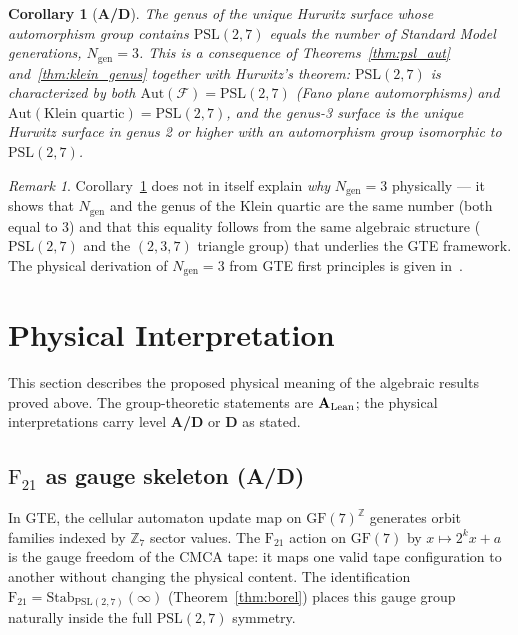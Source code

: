 \documentclass[11pt]{article}
\newtheorem{corollary}[theorem]{Corollary}
\theoremstyle{remark}
\newtheorem{remark}[theorem]{Remark}
\newcommand{\GF}[1]{\ensuremath{\mathrm{GF}(#1)}}
\newcommand{\Ngen}{\ensuremath{N_{\mathrm{gen}}}}
\newcommand{\PSLtwo}{\ensuremath{\mathrm{PSL}(2,7)}}
\newcommand{\FineSeven}{\ensuremath{\mathrm{F}_{21}}}
\newcommand{\CatAL}{\ensuremath{\textbf{A}_{\rm Lean}}}
\newcommand{\CatAD}{\textbf{A/D}}
\newcommand{\CatD}{\textbf{D}}
\begin{document}
\begin{corollary}[\CatAD]
\label{cor:genus_ngen}
The genus of the unique Hurwitz surface whose automorphism group contains $\PSLtwo$
equals the number of Standard Model generations, $\Ngen = 3$.
This is a consequence of Theorems~\ref{thm:psl_aut} and~\ref{thm:klein_genus}
together with Hurwitz's theorem: $\PSLtwo$ is characterized by both
$\mathrm{Aut}(\mathcal{F}) = \PSLtwo$ (Fano plane automorphisms) and
$\mathrm{Aut}(\text{Klein quartic}) = \PSLtwo$, and the genus-3 surface is
the unique Hurwitz surface in genus 2 or higher with an automorphism group
isomorphic to $\PSLtwo$.
\end{corollary}

\begin{remark}
Corollary~\ref{cor:genus_ngen} does not in itself explain \emph{why} $\Ngen = 3$
physically — it shows that $\Ngen$ and the genus of the Klein quartic are the
same number (both equal to 3) and that this equality follows from the same
algebraic structure ($\PSLtwo$ and the $(2,3,7)$ triangle group) that underlies
the GTE framework.
The physical derivation of $\Ngen = 3$ from GTE first principles is given
in~\cite{SpivackGTEMobius,SpivackGTECompleteFramework}.
\end{remark}

\section{Physical Interpretation}
\label{sec:physical}

This section describes the proposed physical meaning of the algebraic results
proved above.
The group-theoretic statements are \CatAL{}; the physical interpretations carry
level \CatAD{} or \CatD{} as stated.

\subsection{\texorpdfstring{$\FineSeven$}{F21} as gauge skeleton (\CatAD)}

In GTE, the cellular automaton update map on $\GF{7}^{\mathbb{Z}}$ generates
orbit families indexed by $\mathbb{Z}_7$ sector values.
The $\FineSeven$ action on $\GF{7}$ by $x \mapsto 2^k x + a$ is the gauge
freedom of the CMCA tape: it maps one valid tape configuration to another
without changing the physical content.
The identification $\FineSeven = \mathrm{Stab}_{\PSLtwo}(\infty)$
(Theorem~\ref{thm:borel}) places this gauge group naturally inside the full
$\PSLtwo$ symmetry.
\end{document}
